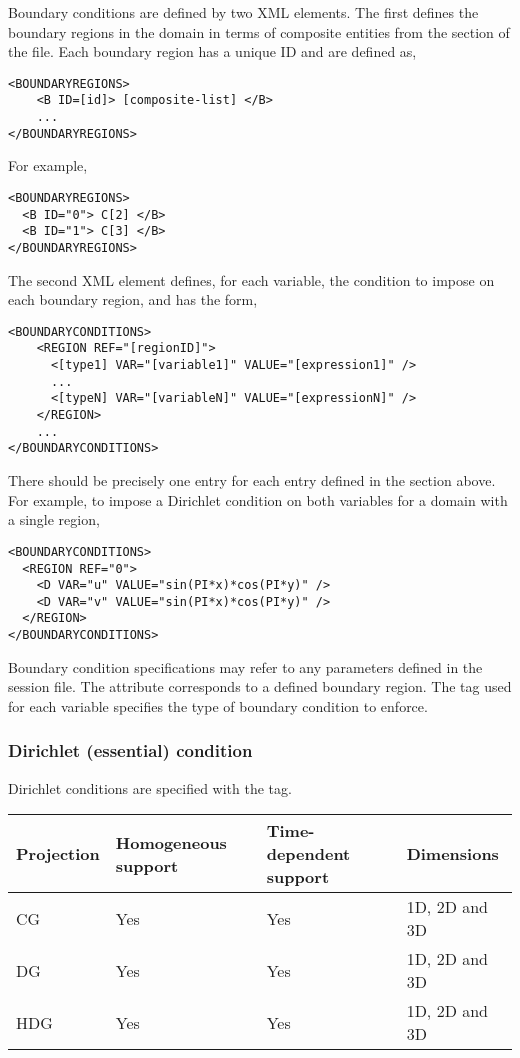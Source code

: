 Boundary conditions are defined by two XML elements. The first defines the
boundary regions in the domain in terms of composite entities from the
 section of the file. Each boundary region has a unique ID and
are defined as, 
\begin{lstlisting}[style=XMLStyle]
<BOUNDARYREGIONS>
    <B ID=[id]> [composite-list] </B>
    ...
</BOUNDARYREGIONS>
\end{lstlisting}
For example,
\begin{lstlisting}[style=XMLStyle]
<BOUNDARYREGIONS>
  <B ID="0"> C[2] </B>
  <B ID="1"> C[3] </B>
</BOUNDARYREGIONS>
\end{lstlisting}

The second XML element defines, for each variable, the condition to impose on
each boundary region, and has the form,
\begin{lstlisting}[style=XMLStyle]
<BOUNDARYCONDITIONS>
    <REGION REF="[regionID]">
      <[type1] VAR="[variable1]" VALUE="[expression1]" />
      ...
      <[typeN] VAR="[variableN]" VALUE="[expressionN]" />
    </REGION>
    ...
</BOUNDARYCONDITIONS>
\end{lstlisting}
There should be precisely one  entry for each  entry
defined in the  section above. For example, to impose a
Dirichlet condition on both variables for a domain with a single region, 
\begin{lstlisting}[style=XMLStyle] 
<BOUNDARYCONDITIONS>
  <REGION REF="0">
    <D VAR="u" VALUE="sin(PI*x)*cos(PI*y)" /> 
    <D VAR="v" VALUE="sin(PI*x)*cos(PI*y)" />
  </REGION>
</BOUNDARYCONDITIONS>
\end{lstlisting}
Boundary condition specifications may refer to any parameters defined in the
session file. The  attribute corresponds to a defined boundary
region. The tag used for each variable specifies the type of boundary condition
to enforce.

\subsubsection{Dirichlet (essential) condition}
Dirichlet conditions are specified with the  tag.

\begin{tabular}{llll}
Projection & Homogeneous support & Time-dependent support & Dimensions \\
\toprule
CG & Yes & Yes & 1D, 2D and 3D \\
DG & Yes & Yes & 1D, 2D and 3D \\
HDG& Yes & Yes & 1D, 2D and 3D
\end{tabular}

